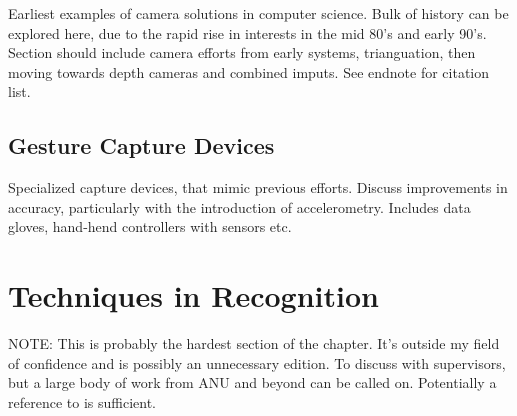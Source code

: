 Earliest examples of camera solutions in computer science. Bulk of history can be explored here, due to the rapid rise in interests in the mid 80's and early 90's. Section should include camera efforts from early systems, trianguation, then moving towards depth cameras  and combined imputs. See endnote for citation list.

\subsection{Gesture Capture Devices}

Specialized capture devices, that mimic previous efforts. Discuss improvements in accuracy, particularly with the introduction of accelerometry. Includes data gloves, hand-hend controllers with sensors etc.

\section{Techniques in Recognition}

NOTE: This is probably the hardest section of the chapter. It's outside my field of confidence and is possibly an unnecessary edition. To discuss with supervisors, but a large body of work from ANU and beyond can be called on. Potentially a reference to \cite{CédrasShah1995} is sufficient.

